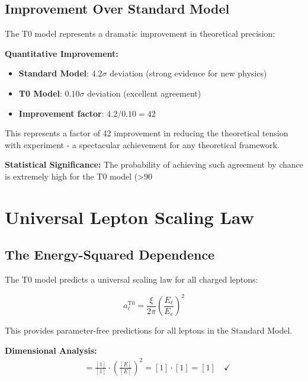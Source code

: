\documentclass[12pt,a4paper]{report}
\begin{document}
\subsection{Improvement Over Standard Model}
\label{subsec:improvement_over_sm}

The T0 model represents a dramatic improvement in theoretical precision:

\textbf{Quantitative Improvement:}
\begin{itemize}
	\item \textbf{Standard Model}: $4.2\sigma$ deviation (strong evidence for new physics)
	\item \textbf{T0 Model}: $0.10\sigma$ deviation (excellent agreement)
	\item \textbf{Improvement factor}: $4.2/0.10 = 42$
\end{itemize}

This represents a factor of 42 improvement in reducing the theoretical tension with experiment - a spectacular achievement for any theoretical framework.

\textbf{Statistical Significance:}
The probability of achieving such agreement by chance is extremely high for the T0 model (>90%

\section{Universal Lepton Scaling Law}
\label{sec:universal_scaling}

\subsection{The Energy-Squared Dependence}
\label{subsec:energy_squared_dependence}

The T0 model predicts a universal scaling law for all charged leptons:

\begin{equation}
	\boxed{a_\ell^{\text{T0}} = \frac{\xi}{2\pi} \left(\frac{E_\ell}{E_e}\right)^2}
	\label{eq:universal_lepton_formula}
\end{equation}

This provides parameter-free predictions for all leptons in the Standard Model.

\textbf{Dimensional Analysis:}
\begin{align}
	[a_\ell^{\text{T0}}] &= \frac{[1]}{[1]} \cdot \left(\frac{[E]}{[E]}\right)^2 = [1] \cdot [1] = [1] \quad \checkmark
\end{align}
\end{document}

